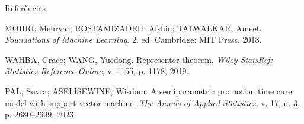 \documentclass[aspectratio=169,t,xcolor=table]{beamer}
\begin{document}
\begin{frame}[allowframebreaks]{Referências}

\footnotesize

MOHRI, Mehryar; ROSTAMIZADEH, Afshin; TALWALKAR, Ameet.
\textit{Foundations of Machine Learning}.
2. ed. Cambridge: MIT Press, 2018.

\vspace{0.4cm}

WAHBA, Grace; WANG, Yuedong. Representer theorem.
\textit{Wiley StatsRef: Statistics Reference Online}, v. 1155, p. 1178, 2019.

\vspace{0.4cm}

PAL, Suvra; ASELISEWINE, Wisdom. A semiparametric promotion time cure model with support vector machine.
\textit{The Annals of Applied Statistics}, v. 17, n. 3, p. 2680--2699, 2023.

\end{frame}
\end{document}
